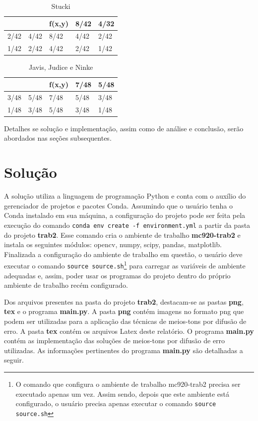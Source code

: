 \documentclass{article}
\begin{document}
\begin{table}[!h]
	\caption*{Stucki}
	\label{tab:stucki}
	\centering
	\begin{tabular}{|l|l|l|l|l|}
		\hline
		&      & f(x,y) & 8/42 & 4/32 \\ \hline
		2/42 & 4/42 & 8/42   & 4/42 & 2/42 \\ \hline
		1/42 & 2/42 & 4/42   & 2/42 & 1/42 \\ \hline
	\end{tabular}
\end{table}

\begin{table}[!h]
	\caption*{Javis, Judice e Ninke}
	\label{tab:javis}
	\centering
	\begin{tabular}{|l|l|l|l|l|}
		\hline
		&      & f(x,y) & 7/48 & 5/48 \\ \hline
		3/48 & 5/48 & 7/48   & 5/48 & 3/48 \\ \hline
		1/48 & 3/48 & 5/48   & 3/48 & 1/48 \\ \hline
	\end{tabular}
\end{table}

Detalhes se solução e implementação, assim como de análise e conclusão, serão abordados nas seções subsequentes.

%
\section{Solução}
A solução utiliza a linguagem de programação Python e conta com o auxílio do gerenciador de projetos e pacotes Conda. Assumindo que o usuário tenha o Conda instalado em sua máquina, a configuração do projeto pode ser feita pela execução do comando \lstinline{conda env create -f environment.yml} a partir da pasta do projeto \textbf{trab2}. Esse comando cria o ambiente de trabalho \textbf{mc920-trab2} e instala os seguintes módulos: opencv, numpy, scipy, pandas, matplotlib. Finalizada a configuração do ambiente de trabalho em questão, o usuário deve executar o comando \lstinline{source source.sh}\footnote{O comando que configura o ambiente de trabalho mc920-trab2 precisa ser executado apenas um vez. Assim sendo, depois que este ambiente está configurado, o usuário precisa apenas executar o comando \lstinline{source source.sh}} para carregar as variáveis de ambiente adequadas e, assim, poder usar os programas do projeto dentro do próprio ambiente de trabalho recém configurado. 

Dos arquivos presentes na pasta do projeto \textbf{trab2}, destacam-se as pastas \textbf{png}, \textbf{tex} e o programa \textbf{main.py}. A pasta \textbf{png} contém imagens no formato png que podem ser utilizadas para a aplicação das técnicas de meios-tons por difusão de erro. A pasta \textbf{tex} contém os arquivos Latex deste relatório. O programa \textbf{main.py} contém as implementação das soluções de meios-tons por difusão de erro utilizadas. As informações pertinentes do programa \textbf{main.py} são detalhadas a seguir.
\end{document}
